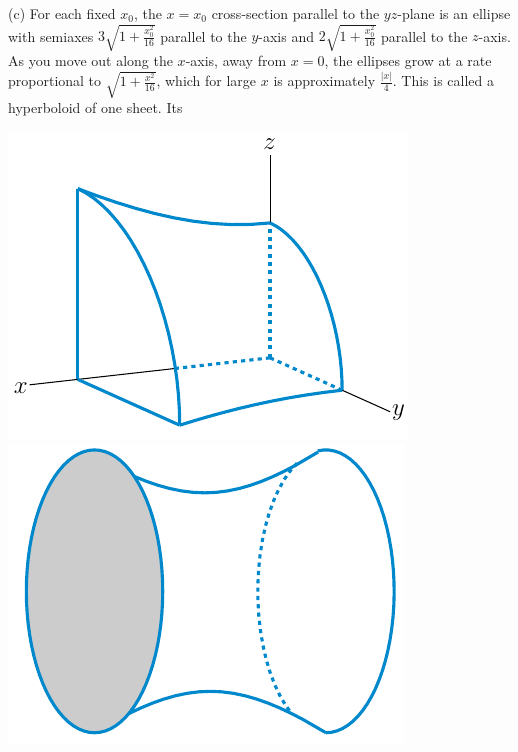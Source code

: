 \begin{solution}
(c)
For each fixed $x_0$, the $x=x_0$ 
cross-section parallel to the $yz$-plane is an ellipse with semiaxes 
$3\sqrt{1+\frac{x_0^2}{16}}$ parallel to the $y$-axis and
$2\sqrt{1+\frac{x_0^2}{16}}$ parallel to the $z$-axis. 
 As you move out along the $x$-axis, away from $x=0$, the ellipses grow
at a rate proportional to $\sqrt{1+\frac{x^2}{16}}$, which for large $x$
is approximately $\frac{|x|}{4}$.
This is called a hyperboloid of one sheet. Its 
\begin{center}
     \includegraphics{fig/hyperboloidX_l.pdf}\qquad
     \includegraphics[scale=0.9]{fig/hyperboloidX_r.pdf}
\end{center}


\end{solution}
